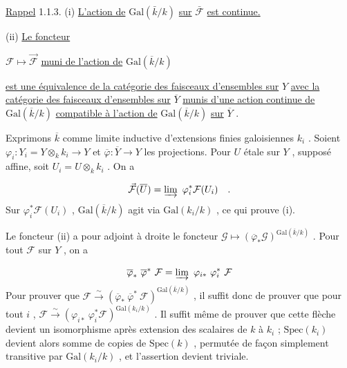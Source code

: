 \underline{Rappel} 1.1.3. (i) \underline{L'action de} $\mathrm{Gal}(\bar{k}/k)$ \underline{sur} $\bar{\mathcal{F}}$ \underline{est continue.}



(ii) \underline{Le foncteur}

$\mathcal{F} \longmapsto \vec{\mathcal{F}}$ \underline{muni de l'action de} $\mathrm{Gal}(\overline{k}/k)$

\underline{est une équivalence de la catégorie des faisceaux d'ensembles sur} $Y$ \underline{avec la catégorie des faisceaux d'ensembles sur} $\overline{Y}$ \underline{munis d'une action continue de} $\mathrm{Gal}(\overline{k}/k)$ \underline{compatible à l'action de} $\mathrm{Gal}(\overline{k}/k)$ \underline{sur} $\overline{Y}$ .

Exprimons $\overline{k}$ comme limite inductive d'extensions finies galoisiennes $k_i$ . Soient $\varphi_i : Y_i = Y \otimes_k k_i \longrightarrow Y$ et $\overline{\varphi} : \overline{Y} \longrightarrow Y$ les projections. Pour $U$ étale sur $Y$ , supposé affine, soit $U_i = U \otimes_k k_i$ . On a

\begin{equation*}
\vec{\mathcal{F}}(\overline{U}) = \varinjlim \ \varphi_i^* \mathcal{F}(U_i) \quad .
\end{equation*}
Sur $\varphi_i^* \mathcal{F}(U_i)$ , $\mathrm{Gal}(\overline{k}/k)$ agit via $\mathrm{Gal}(k_i/k)$ , ce qui prouve (i).

Le foncteur (ii) a pour adjoint à droite le foncteur $\mathcal{G} \longmapsto (\overline{\varphi}_* \mathcal{G})^{\mathrm{Gal}(\overline{k}/k)}$ . Pour tout $\mathcal{F}$ sur $Y$ , on a

\begin{equation*}
\overline{\varphi}_* \ \overline{\varphi}^* \ \mathcal{F} = \varinjlim \ \varphi_{i*} \ \varphi_i^* \ \mathcal{F}
\end{equation*}
Pour prouver que $\mathcal{F} \overset{\sim}{\longrightarrow} (\overline{\varphi}_* \ \overline{\varphi}^* \ \mathcal{F})^{\mathrm{Gal}(\overline{k}/k)}$ , il suffit donc de prouver que pour tout $i$ , $\mathcal{F} \overset{\sim}{\longrightarrow} (\varphi_{i*} \ \varphi_i^* \mathcal{F})^{\mathrm{Gal}(k_i/k)}$ . Il suffit même de prouver que cette flèche devient un isomorphisme après extension des scalaires de $k$ à $k_i$ ; $\mathrm{Spec}(k_i)$ devient alors somme de copies de $\mathrm{Spec}(k)$ , permutée de façon simplement transitive par $\mathrm{Gal}(k_i/k)$ , et l'assertion devient triviale.

